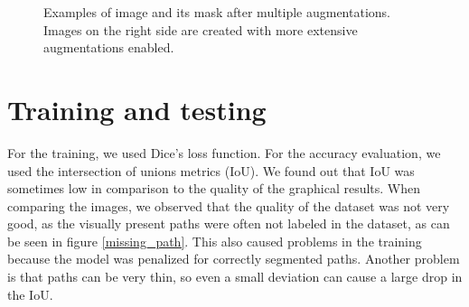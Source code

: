 \documentclass[12pt]{article}
\begin{document}
\begin{figure}[h]
    \centering
    \caption{Examples of image and its mask after multiple augmentations. Images on the right side are created with more extensive augmentations enabled.}
    \label{augmentations}
\end{figure}






\section{Training and testing}

For the training, we used Dice's loss function. For the accuracy evaluation, we used the intersection of unions metrics (IoU). We found out that IoU was sometimes low in comparison to the quality of the graphical results. When comparing the images, we observed that the quality of the dataset was not very good, as the visually present paths were often not labeled in the dataset, as can be seen in figure \ref{missing_path}. This also caused problems in the training because the model was penalized for correctly segmented paths. Another problem is that paths can be very thin, so even a small deviation can cause a large drop in the IoU.
\end{document}
